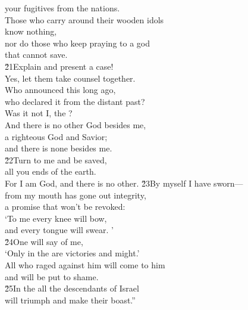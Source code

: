 \begin{poetry}
\poemlll       your fugitives from the nations. \\
\poeml Those who carry around their wooden idols \\
\poemll    know nothing, \\
\poeml nor do those who keep praying to a god \\
\poemll    that cannot save. \\
\poeml \v{21}Explain and present a case! \\
\poemll    Yes, let them take counsel together. \\
\poeml Who announced this long ago, \\
\poemll    who declared it from the distant past? \\
\poemlll       Was it not I, the ? \\
\poeml And there is no other God besides me, \\
\poemll    a righteous God and Savior; \\
\poemlll       and there is none besides me. \\
\poeml \v{22}Turn to me and be saved, \\
\poemll    all you ends of the earth. \\
\poemlll       For I am God, and there is no other.
\poeml \v{23}By myself I have sworn--- \\
\poemll    from my mouth has gone out integrity, \\
\poemlll       a promise that won't be revoked: \\
\poeml `To me every knee will bow, \\
\poemll    and every tongue will swear. ' \\
\poeml \v{24}One will say of me, \\
\poemll    `Only in the  are victories and might.' \\
\poeml All who raged against him will come to him \\
\poemll    and will be put to shame. \\
\poeml \v{25}In the  all the descendants of Israel \\
\poemll    will triumph and make their boast.''
\end{poetry}

